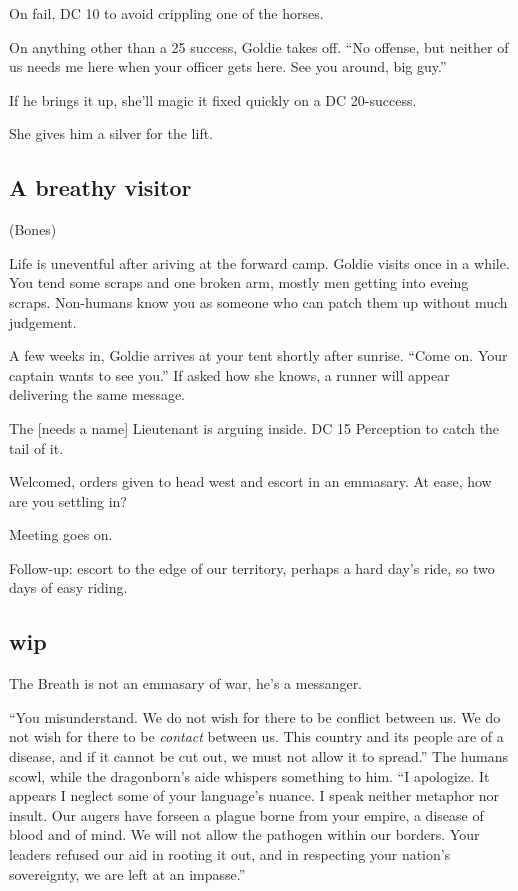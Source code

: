 \begin{multicols}{2}
On fail, DC 10 to avoid crippling one of the horses.

On anything other than a 25 success, Goldie takes off.
``No offense, but neither of us needs me here when your officer gets here.
See you around, big guy.''

If he brings it up, she'll magic it fixed quickly on a DC 20-success.

She gives him a silver for the lift.

\subsection{A breathy visitor}
(Bones)

Life is uneventful after ariving at the forward camp.
Goldie visits once in a while.
You tend some scraps and one broken arm, mostly men getting into eveing scraps.
Non-humans know you as someone who can patch them up without much judgement.

A few weeks in, Goldie arrives at your tent shortly after sunrise.
``Come on.
  Your captain wants to see you.''
If asked how she knows, a runner will appear delivering the same message.

The [needs a name] Lieutenant is arguing inside.
DC 15 Perception to catch the tail of it.

Welcomed, orders given to head west and escort in an emmasary.
At ease, how are you settling in?

Meeting goes on.

Follow-up: escort to the edge of our territory, perhaps a hard day's ride, so two days of easy
  riding.

\subsection{wip}

The Breath is not an emmasary of war, he's a messanger.

  \begin{aloud}
  ``You misunderstand.
    We do not wish for there to be conflict between us.
    We do not wish for there to be \emph{contact} between us.
    This country and its people are of a disease,
      and if it cannot be cut out, we must not allow it to spread.''
    The humans scowl, while the dragonborn's aide whispers something to him.
  ``I apologize.
    It appears I neglect some of your language's nuance.
    I speak neither metaphor nor insult.
    Our augers have forseen a plague borne from your empire, a disease of blood and of mind.
    We will not allow the pathogen within our borders.
    Your leaders refused our aid in rooting it out, and in respecting your nation's sovereignty,
      we are left at an impasse.''


\end{aloud}
\end{multicols}
